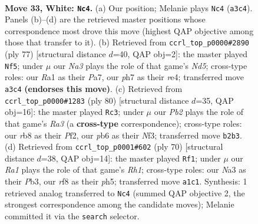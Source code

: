 \documentclass[11pt]{article}
\begin{document}
\clearpage

\begin{figure}[p]\centering
\begin{subfigure}{0.46\textwidth}\centering
\resizebox{\linewidth}{!}{%
\newchessgame
\chessboard[
  setfen={1r3r2/6kp/1p2Q3/p7/7P/N7/PP3PP1/R5K1 w - - 3 33},
  showmover=false,
  pgfstyle=straightmove, color=movearrow, markmove={a3-c4}
]}
\caption{}
\end{subfigure}\hfill
\begin{subfigure}{0.46\textwidth}\centering
\resizebox{\linewidth}{!}{%
\newchessgame
\chessboard[
  setfen={8/p7/5kpp/2q5/3nR3/P3R3/B4PP1/6K1 b - - 2 39},
  showmover=false,
  pgfstyle=straightmove, color=movearrow, markmove={d4-f5}
]}
\caption{}
\end{subfigure}
\\[4pt]
\begin{subfigure}{0.46\textwidth}\centering
\resizebox{\linewidth}{!}{%
\newchessgame
\chessboard[
  setfen={3r1rk1/6p1/4p2p/2n5/8/R4N1P/4RPP1/6K1 w - - 0 41},
  showmover=false,
  pgfstyle=straightmove, color=movearrow, markmove={a3-c3}
]}
\caption{}
\end{subfigure}\hfill
\begin{subfigure}{0.46\textwidth}\centering
\resizebox{\linewidth}{!}{%
\newchessgame
\chessboard[
  setfen={8/p4rpk/5r2/7p/3R1P1P/1PK5/P7/7R w - - 2 36},
  showmover=false,
  pgfstyle=straightmove, color=movearrow, markmove={h1-f1}
]}
\caption{}
\end{subfigure}
\caption{\textbf{Move 33, White: \texttt{Nc4}.} (a) Our position; Melanie plays \texttt{Nc4} (\texttt{a3c4}). Panels (b)--(d) are the retrieved master positions whose correspondence most drove this move (highest QAP objective among those that transfer to it). (b) Retrieved from \texttt{ccrl\_top\_p0000\#2890} (ply 77) [structural distance $d$=40, QAP obj=2]: the master played \texttt{Nf5}; under $\mu$ our \emph{Na3} plays the role of that game's \emph{Nd5}; cross-type roles: our \emph{R}a1 as their \emph{P}a7, our \emph{p}h7 as their \emph{r}e4; transferred move \texttt{a3c4} \textbf{(endorses this move)}. (c) Retrieved from \texttt{ccrl\_top\_p0000\#1283} (ply 80) [structural distance $d$=35, QAP obj=16]: the master played \texttt{Rc3}; under $\mu$ our \emph{Pb2} plays the role of that game's \emph{Ra3} (a \textbf{cross-type} correspondence); cross-type roles: our \emph{r}b8 as their \emph{P}f2, our \emph{p}b6 as their \emph{N}f3; transferred move \texttt{b2b3}. (d) Retrieved from \texttt{ccrl\_top\_p0001\#602} (ply 70) [structural distance $d$=38, QAP obj=14]: the master played \texttt{Rf1}; under $\mu$ our \emph{Ra1} plays the role of that game's \emph{Rh1}; cross-type roles: our \emph{N}a3 as their \emph{P}b3, our \emph{r}f8 as their \emph{p}h5; transferred move \texttt{a1c1}. Synthesis: 1 retrieved analog transferred to \texttt{Nc4} (summed QAP objective 2, the strongest correspondence among the candidate moves); Melanie committed it via the \texttt{search} selector.}
\label{fig:thought-m64}
\end{figure}
\end{document}

